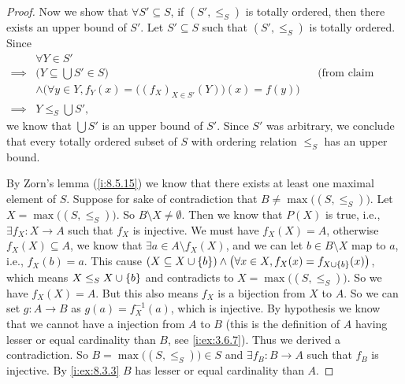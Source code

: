 \begin{proof}
  Now we show that \(\forall S' \subseteq S\), if \((S', \leq_S)\) is totally ordered, then there exists an upper bound of \(S'\).
  Let \(S' \subseteq S\) such that \((S', \leq_S)\) is totally ordered.
  Since
  \begin{align*}
             & \forall Y \in S'                                                                                                 \\
    \implies & \Big(Y \subseteq \bigcup S' \in S\Big)                                            &  & \text{(from claim above)} \\
             & \land \Big(\forall y \in Y, f_Y(x) = \big((f_X)_{X \in S'}(Y)\big)(x) = f(y)\Big)                                \\
    \implies & Y \leq_S \bigcup S',
  \end{align*}
  we know that \(\bigcup S'\) is an upper bound of \(S'\).
  Since \(S'\) was arbitrary, we conclude that every totally ordered subset of \(S\) with ordering relation \(\leq_S\) has an upper bound.

  By Zorn's lemma (\cref{i:8.5.15}) we know that there exists at least one maximal element of \(S\).
  Suppose for sake of contradiction that \(B \neq \max\big((S, \leq_S)\big)\).
  Let \(X = \max\big((S, \leq_S)\big)\).
  So \(B \setminus X \neq \emptyset\).
  Then we know that \(P(X)\) is true, i.e., \(\exists f_X : X \to A\) such that \(f_X\) is injective.
  We must have \(f_X(X) = A\), otherwise \(f_X(X) \subseteq A\), we know that \(\exists a \in A \setminus f_X(X)\), and we can let \(b \in B \setminus X\) map to \(a\), i.e., \(f_X(b) = a\).
  This cause \((X \subseteq X \cup \left\lbrace b\right\rbrace) \land \big(\forall x \in X, f_X(x) = f_{X \cup \left\lbrace b\right\rbrace}(x)\big)\), which means \(X \leq_S X \cup \left\lbrace b\right\rbrace\) and contradicts to \(X = \max\big((S, \leq_S)\big)\).
  So we have \(f_X(X) = A\).
  But this also means \(f_X\) is a bijection from \(X\) to \(A\).
  So we can set \(g : A \to B\) as \(g(a) = f_X^{-1}(a)\), which is injective.
  By hypothesis we know that we cannot have a injection from \(A\) to \(B\) (this is the definition of \(A\) having lesser or equal cardinality than \(B\), see \cref{i:ex:3.6.7}).
  Thus we derived a contradiction.
  So \(B = \max\big((S, \leq_S)\big) \in S\) and \(\exists f_B : B \to A\) such that \(f_B\) is injective.
  By \cref{i:ex:8.3.3} \(B\) has lesser or equal cardinality than \(A\).
\end{proof}

